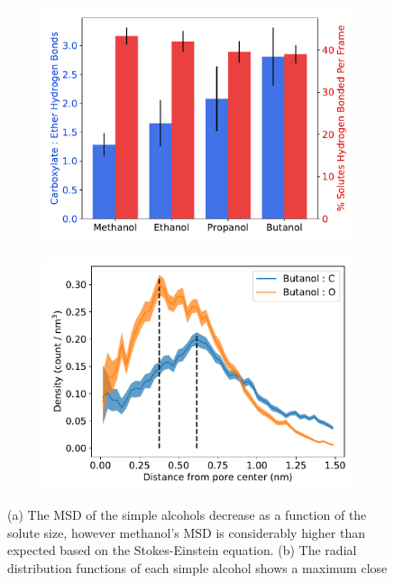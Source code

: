 \documentclass{article}
\begin{document}
\begin{figure}
\begin{subfigure}{0.45\textwidth}
  \includegraphics[width=\linewidth]{simple_alcohol_hbonds.pdf}
  \caption{}\label{fig:simple_alcohol_hbonds}
  \end{subfigure}
  \begin{subfigure}{0.45\textwidth}
  \includegraphics[width=\linewidth]{butanol_CO.pdf}  %
  \caption{}\label{fig:butanol_CO}
  \end{subfigure}
  \caption{(a) The MSD of the simple alcohols decrease as a function of the solute size, however
  methanol's MSD is considerably higher than expected based on the Stokes-Einstein equation. 
  (b) The radial distribution functions of each simple alcohol shows a maximum close
}
\end{figure}
\end{document}
